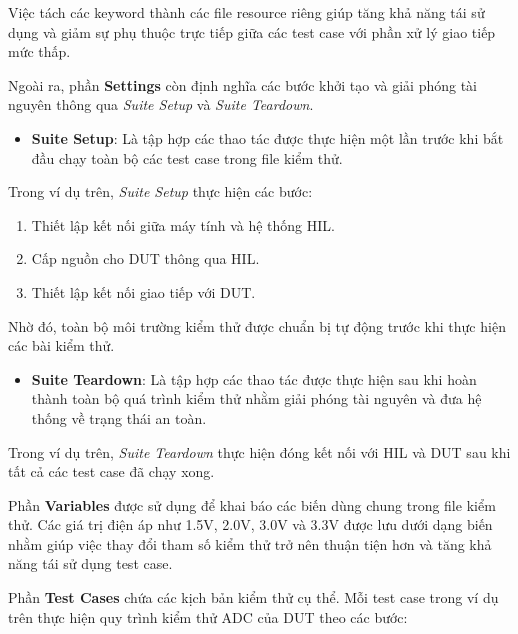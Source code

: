 Việc tách các keyword thành các file resource riêng giúp tăng khả năng tái sử dụng và giảm sự phụ thuộc trực tiếp giữa các test case với phần xử lý giao tiếp mức thấp.

Ngoài ra, phần \textbf{Settings} còn định nghĩa các bước khởi tạo và giải phóng tài nguyên thông qua \textit{Suite Setup} và \textit{Suite Teardown}.

\begin{itemize}

    \item \textbf{Suite Setup}: Là tập hợp các thao tác được thực hiện một lần trước khi bắt đầu chạy toàn bộ các test case trong file kiểm thử.

\end{itemize}

Trong ví dụ trên, \textit{Suite Setup} thực hiện các bước:

\begin{enumerate}

    \item Thiết lập kết nối giữa máy tính và hệ thống HIL.
    
    \item Cấp nguồn cho DUT thông qua HIL.
    
    \item Thiết lập kết nối giao tiếp với DUT.

\end{enumerate}

Nhờ đó, toàn bộ môi trường kiểm thử được chuẩn bị tự động trước khi thực hiện các bài kiểm thử.

\begin{itemize}

    \item \textbf{Suite Teardown}: Là tập hợp các thao tác được thực hiện sau khi hoàn thành toàn bộ quá trình kiểm thử nhằm giải phóng tài nguyên và đưa hệ thống về trạng thái an toàn.

\end{itemize}

Trong ví dụ trên, \textit{Suite Teardown} thực hiện đóng kết nối với HIL và DUT sau khi tất cả các test case đã chạy xong.

Phần \textbf{Variables} được sử dụng để khai báo các biến dùng chung trong file kiểm thử. Các giá trị điện áp như 1.5V, 2.0V, 3.0V và 3.3V được lưu dưới dạng biến nhằm giúp việc thay đổi tham số kiểm thử trở nên thuận tiện hơn và tăng khả năng tái sử dụng test case.

Phần \textbf{Test Cases} chứa các kịch bản kiểm thử cụ thể. Mỗi test case trong ví dụ trên thực hiện quy trình kiểm thử ADC của DUT theo các bước:

